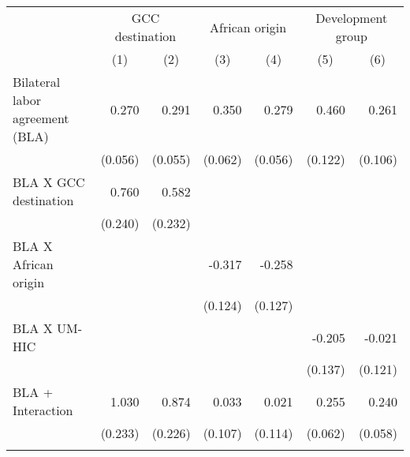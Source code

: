 \begin{tabular}{l*{6}{r}} \toprule
                    &\multicolumn{2}{c}{GCC destination}        &\multicolumn{2}{c}{African origin}         &\multicolumn{2}{c}{Development group}      \\\cmidrule(lr){2-3}\cmidrule(lr){4-5}\cmidrule(lr){6-7}
                    &\multicolumn{1}{c}{(1)}         &\multicolumn{1}{c}{(2)}         &\multicolumn{1}{c}{(3)}         &\multicolumn{1}{c}{(4)}         &\multicolumn{1}{c}{(5)}         &\multicolumn{1}{c}{(6)}         \\
\midrule
Bilateral labor agreement (BLA)&       0.270\sym{***}&       0.291\sym{***}&       0.350\sym{***}&       0.279\sym{***}&       0.460\sym{***}&       0.261\sym{**} \\
                    &     (0.056)         &     (0.055)         &     (0.062)         &     (0.056)         &     (0.122)         &     (0.106)         \\
BLA X GCC destination&       0.760\sym{***}&       0.582\sym{**} &                     &                     &                     &                     \\
                    &     (0.240)         &     (0.232)         &                     &                     &                     &                     \\
BLA X African origin&                     &                     &      -0.317\sym{**} &      -0.258\sym{**} &                     &                     \\
                    &                     &                     &     (0.124)         &     (0.127)         &                     &                     \\
BLA X UM-HIC        &                     &                     &                     &                     &      -0.205         &      -0.021         \\
                    &                     &                     &                     &                     &     (0.137)         &     (0.121)         \\
\addlinespace
BLA + Interaction   &       1.030\sym{***}&       0.874\sym{***}&       0.033         &       0.021         &       0.255\sym{***}&       0.240\sym{***}\\
                    &     (0.233)         &     (0.226)         &     (0.107)         &     (0.114)         &     (0.062)         &     (0.058)         \\\bottomrule
\addlinespace
\addlinespace

\end{tabular}
